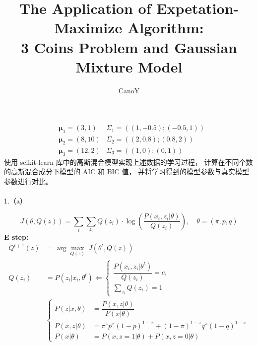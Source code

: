 \documentclass[fleqn,answers]{exam}
\title{The Application of Expetation-Maximize Algorithm:\\ 3 Coins Problem and Gaussian Mixture Model}
\author{CanoY}
\begin{document}
\maketitle
\thispagestyle{headandfoot}
\begin{questions}
    \begin{align*}
        &\boldsymbol{\mu}_1=(3,1) &\Sigma_1=((1,-0.5);(-0.5,1))\\
        &\boldsymbol{\mu}_2=(8,10) &\Sigma_2=((2,0.8);(0.8,2))\\
        &\boldsymbol{\mu}_3=(12,2) &\Sigma_3=((1,0);(0,1))
    \end{align*}
使用 scikit-learn 库中的高斯混合模型实现上述数据的学习过程，
计算在不同个数的高斯混合成分下模型的 AIC 和 BIC 值，
并将学习得到的模型参数与真实模型参数进行对比。\\
~\\
1.（a）
\begin{solution}
        $$J(\theta,Q(z))=\sum\limits_i \sum\limits_{z_i} Q(z_i)\cdot\log(\frac{P(x_i,z_i \vert \theta)}{Q(z_i)}), \quad \theta=(\pi,p,q)$$
    \textbf{E step:}
    \begin{align*}
        Q^{t+1}(z)&=\arg\max\limits_{Q(z)} ~ J(\theta^t,Q(z))\\
        Q(z_i)&=P(z_i \vert x_i,\theta^t)\Leftarrow
            \begin{cases}
                \dfrac{P(x_i,z_i \vert \theta^t)}{Q(z_i)}=c,\\
                \sum\limits_{z_i} Q(z_i)=1
            \end{cases}\\
            &\begin{cases}
                P(z \vert x,\theta)&=\dfrac{P(x,z \vert \theta)}{P(x \vert \theta)}\\
                P(x,z \vert \theta)&=\pi^z p^x (1-p)^{1-x} + (1-\pi)^{1-z} q^x (1-q)^{1-x}\\
                P(x \vert \theta)&=P(x,z=1 \vert \theta)+P(x,z=0 \vert \theta)

\end{cases}
\end{align*}
\end{solution}
\end{questions}
\end{document}
